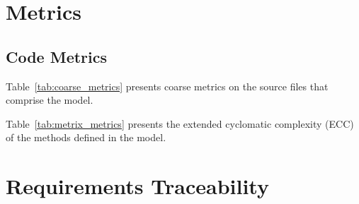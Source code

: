 \section{Metrics}
\subsection{Code Metrics}

Table~\ref{tab:coarse_metrics} presents coarse metrics on the
source files that comprise the model.



Table~\ref{tab:metrix_metrics} presents the extended cyclomatic
complexity
(ECC) of the methods defined in the model.



\section{Requirements Traceability}\label{sec:traceability}

